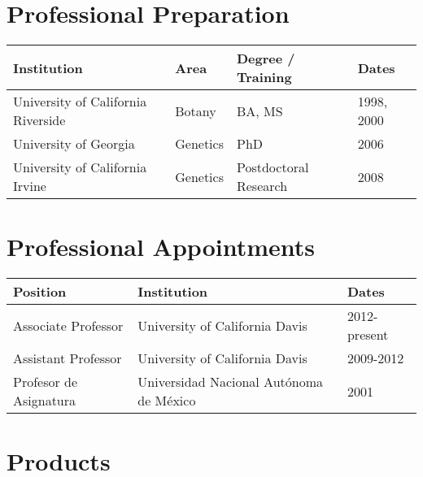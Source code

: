 

\section{Professional Preparation}

\begin{tabular}{l l l l}
Institution    \hspace{52mm}              &   Area  \hspace{10mm}     & Degree / Training  \hspace{13mm}    & Dates \\
\hline
University of California Riverside & Botany & BA, MS & 1998, 2000 \\
University of Georgia & Genetics & PhD & 2006\\
University of California Irvine & Genetics & Postdoctoral Research & 2008 \\
\end{tabular}

\section{Professional Appointments}

\begin{tabular}{l l l}
Position & Institution                 & Dates\\
\hline
Associate Professor & University of California Davis &		2012-present \\
Assistant Professor & University of California Davis &		2009-2012 \\
Profesor de Asignatura & Universidad Nacional Aut\'{o}noma de M\'{e}xico & 2001 \\
\end{tabular}

\section{Products}

